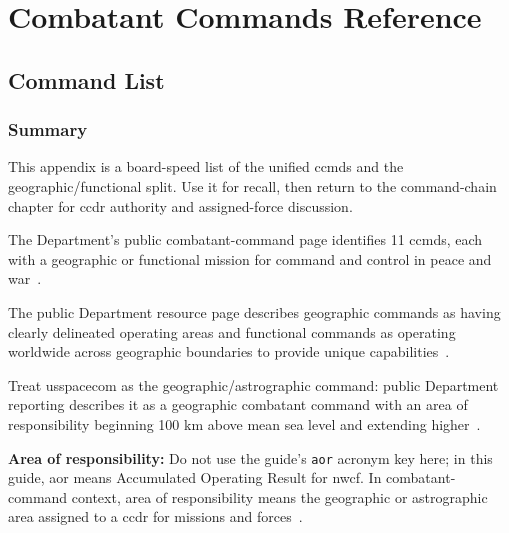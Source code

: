 \documentclass[../main.tex]{subfiles}
\begin{document}
\chapter{Combatant Commands Reference}\label{app:combatant-commands}

\section{Command List}
\subsection{Summary}
\begin{description}[style=nextline, labelsep=0.5em, font=\bfseries]
  \item[Purpose.] This appendix is a board-speed list of the unified \acp{ccmd} and the geographic/functional split. Use it for recall, then return to the command-chain chapter for \ac{ccdr} authority and assigned-force discussion.
  \item[Current count.] The Department's public combatant-command page identifies 11 \acp{ccmd}, each with a geographic or functional mission for command and control in peace and war~\autocite{DOW-CombatantCommands-2026}.
  \item[Geographic vs.\ functional.] The public Department resource page describes geographic commands as having clearly delineated operating areas and functional commands as operating worldwide across geographic boundaries to provide unique capabilities~\autocite{DOW-UnifiedCombatantCommands-2026}.
  \item[Space Command cue.] Treat \ac{usspacecom} as the geographic/astrographic command: public Department reporting describes it as a geographic combatant command with an area of responsibility beginning 100 km above mean sea level and extending higher~\autocite{DoD-Spacecom-Strategic-Environment-2019}.
\end{description}

\noindent\textbf{Area of responsibility:} Do not use the guide's \texttt{aor} acronym key here; in this guide, \ac{aor} means Accumulated Operating Result for \ac{nwcf}. In combatant-command context, area of responsibility means the geographic or astrographic area assigned to a \ac{ccdr} for missions and forces~\autocite{USC-162,DOW-UnifiedCombatantCommands-2026}.
\end{document}
